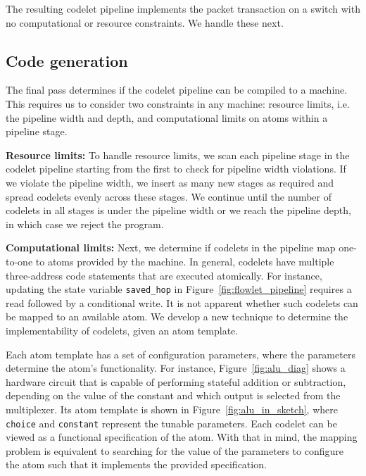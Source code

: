 The resulting codelet pipeline implements the packet transaction on a switch
with no computational or resource constraints. We handle these next.


\subsection{Code generation}
\label{ss:code_gen}

The final pass determines if the codelet pipeline can be compiled to a
\absmachine machine.  This requires us to consider two constraints in
any \absmachine machine: resource limits, i.e. the pipeline width and
depth, and computational limits on atoms within a pipeline stage.

\textbf{Resource limits:} To handle resource limits, we scan each pipeline stage in the codelet pipeline
starting from the first to check for pipeline width violations.  If we violate
the pipeline width, we insert as many new stages as required and spread
codelets evenly across these stages.  We continue until the number of codelets
in all stages is under the pipeline width or we reach the pipeline depth, in
which case we reject the program.

\textbf{Computational limits:} Next, we determine if codelets in the pipeline map one-to-one to atoms provided
by the \absmachine machine. In general, codelets have multiple three-address
code statements that are executed atomically. For instance, updating the state
variable \texttt{saved\_hop} in Figure~\ref{fig:flowlet_pipeline} requires a
read followed by a conditional write.  It is not apparent whether such codelets
can be mapped to an available atom. We develop a new technique to determine the
implementability of codelets, given an atom template.

Each atom template has a set of configuration parameters, where the parameters
determine the atom's functionality.  For instance, Figure~\ref{fig:alu_diag}
shows a hardware circuit that is capable of performing stateful addition or
subtraction, depending on the value of the constant and which output is
selected from the multiplexer.  Its atom template is shown in
Figure~\ref{fig:alu_in_sketch}, where {\tt choice} and {\tt constant} represent
the tunable parameters.  Each codelet can be viewed as a functional
specification of the atom.  With that in mind, the mapping problem is
equivalent to searching for the value of the parameters to configure the atom
such that it implements the provided specification.

